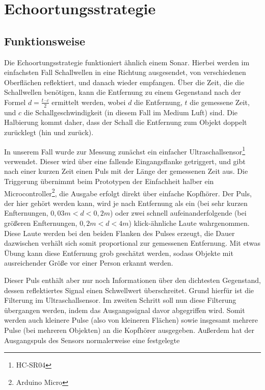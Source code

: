 \documentclass[a4paper,12pt,ngerman]{scrartcl}
\begin{document}
\newpage

\section{Echoortungsstrategie}

\subsection{Funktionsweise}

Die Echoortungsstrategie funktioniert ähnlich einem Sonar. Hierbei werden im einfachsten 
Fall Schallwellen in eine Richtung ausgesendet, von verschiedenen Oberflächen reflektiert,
und danach wieder empfangen. Über die Zeit, die die Schallwellen benötigen, kann die 
Entfernung zu einem Gegenstand nach der Formel $d = \frac{t \cdot c}{2}$ ermittelt werden,
wobei $d$ die Entfernung, $t$ die gemessene Zeit, und $c$ die Schallgeschwindigkeit (in 
diesem Fall im Medium Luft) sind. Die Halbierung kommt daher, dass der Schall die 
Entfernung zum Objekt doppelt zurücklegt (hin und zurück). \par
In unserem Fall wurde zur Messung zunächst ein einfacher Ultraschallsensor\footnote{HC-SR04} 
verwendet. Dieser wird über eine fallende Eingangsflanke getriggert, und gibt nach einer 
kurzen Zeit einen Puls mit der Länge der gemessenen Zeit aus. Die Triggerung übernimmt 
beim Prototypen der Einfachheit halber ein Microcontroller\footnote{Arduino Micro}, die 
Ausgabe erfolgt direkt über einfache Kopfhörer. Der Puls, der hier gehört werden kann, 
wird je nach Entfernung als ein (bei sehr kurzen Enfternungen, $0,03m < d < 0,2m$) oder 
zwei schnell aufeinanderfolgende (bei größeren Enfternungen, $0,2m < d < 4m$) klick-ähnliche 
Laute wahrgenommen. Diese Laute werden bei den beiden Flanken des Pulses erzeugt, die Dauer 
dazwischen verhält sich somit proportional zur gemessenen Entfernung. Mit etwas Übung kann 
diese Entfernung grob geschätzt werden, sodass Objekte mit ausreichender Größe vor einer 
Person erkannt werden. \par
Dieser Puls enthält aber nur noch Informationen über den dichtesten Gegenstand, dessen 
reflektiertes Signal einen Schwellwert überschreitet. Grund hierfür ist die Filterung im 
Ultraschallsensor. Im zweiten Schritt soll nun diese Filterung übergangen werden, indem 
das Ausgangssignal davor abgegriffen wird. Somit werden auch kleinere Pulse (also von 
kleineren Flächen) sowie insgesamt mehrere Pulse (bei mehreren Objekten) an die Kopfhörer 
ausgegeben. Außerdem hat der Ausgangspuls des Sensors normalerweise eine festgelegte 
\end{document}
